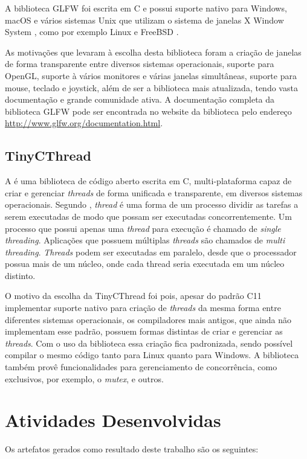 \documentclass[12pt, %
openright,
oneside, %
a4paper,    %
brazil]{facom-ufu-abntex2}
\begin{document}
A biblioteca GLFW foi escrita em C e possui suporte nativo para Windows, macOS e vários sistemas Unix \cite{Unix:About} que utilizam o sistema de janelas X Window System \cite{X:About}, como por exemplo Linux \cite{Linux:About} e FreeBSD \cite{FreeBSD:About}.

As motivações que levaram à escolha desta biblioteca foram a criação de janelas de forma transparente entre diversos sistemas operacionais, suporte para OpenGL, suporte à vários monitores e várias janelas simultâneas, suporte para mouse, teclado e joystick, além de ser a biblioteca mais atualizada, tendo vasta documentação e grande comunidade ativa. A documentação completa da biblioteca GLFW pode ser encontrada no website da biblioteca pelo endereço \url{http://www.glfw.org/documentation.html}.

\subsection{TinyCThread}
A  é uma biblioteca de código aberto escrita em C, multi-plataforma capaz de criar e gerenciar \textit{threads} de forma unificada e transparente, em diversos sistemas operacionais. Segundo , \textit{thread} é uma forma de um processo dividir as tarefas a serem executadas de modo que possam ser executadas concorrentemente. Um processo que possui apenas uma \textit{thread} para execução é chamado de \textit{single threading}. Aplicações que possuem múltiplas \textit{threads} são chamados de \textit{multi threading}. \textit{Threads} podem ser executadas em paralelo, desde que o processador possua mais de um núcleo, onde cada thread seria executada em um núcleo distinto.

O motivo da escolha da TinyCThread foi pois, apesar do padrão C11 implementar suporte nativo para criação de \textit{threads} da mesma forma entre diferentes sistemas operacionais, os compiladores mais antigos, que ainda não implementam esse padrão, possuem formas distintas de criar e gerenciar as \textit{threads}. Com o uso da biblioteca essa criação fica padronizada, sendo possível compilar o mesmo código tanto para Linux quanto para Windows. A biblioteca também provê funcionalidades para gerenciamento de concorrência, como  exclusivos, por exemplo, o \textit{mutex}, e outros.

\section{Atividades Desenvolvidas}
Os artefatos gerados como resultado deste trabalho são os seguintes:
\end{document}
